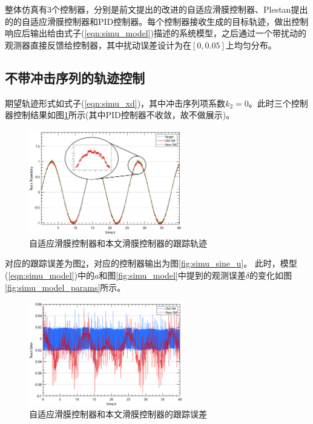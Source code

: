 整体仿真有3个控制器，分别是前文提出的改进的自适应滑膜控制器、Plestan提出的的自适应滑膜控制器和PID控制器。每个控制器接收生成的目标轨迹，做出控制响应后输出给由式子(\ref{eqn:simu_model})描述的系统模型，之后通过一个带扰动的观测器直接反馈给控制器，其中扰动误差设计为在$[0,0.05]$上均匀分布。
\FloatBarrier
\subsection{不带冲击序列的轨迹控制}

期望轨迹形式如式子(\ref{eqn:simu_xd})，其中冲击序列项系数$k_2=0$。此时三个控制器控制结果如图\ref{fig:simu_sine_trajectory}所示(其中PID控制器不收敛，故不做展示)。

\begin{figure}[H]
    \centering
    \includegraphics[width=0.6\textwidth]{imgs/simu_sine_track.png}
    \caption{自适应滑膜控制器和本文滑膜控制器的跟踪轨迹}
    \label{fig:simu_sine_trajectory}
\end{figure}

对应的跟踪误差为图\ref{fig:simu_sine_error}，对应的控制器输出为图\ref{fig:simu_sine_u}。
此时，模型(\ref{eqn:simu_model})中的$a$和图\ref{fig:simu_model}中提到的观测误差$\delta$的变化如图\ref{fig:simu_model_params}所示。

\begin{figure}[H]
    \centering
    \includegraphics[width=0.6\textwidth]{imgs/simu_sine_error.png}
    \caption{自适应滑膜控制器和本文滑膜控制器的跟踪误差}
    \label{fig:simu_sine_error}
\end{figure}

